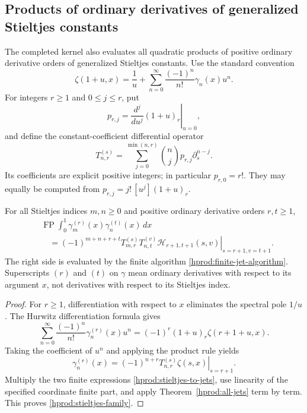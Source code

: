 \subsection{Products of ordinary derivatives of generalized Stieltjes constants}

The completed kernel also evaluates all quadratic products of positive
ordinary derivative orders of generalized Stieltjes constants.  Use the
standard convention
\[
 \zeta(1+u,x)=\frac1u+
 \sum_{n=0}^{\infty}\frac{(-1)^n}{n!}\gamma_n(x)u^n.
\]
For integers $r\ge1$ and $0\le j\le r$, put
\[
 p_{r,j}=\left.\frac{d^j}{du^j}(1+u)_r\right|_{u=0},
\]
and define the constant-coefficient differential operator
\begin{equation}\label{hprod:stieltjes-operator}
 T_{n,r}^{(s)}=
 \sum_{j=0}^{\min(n,r)}\binom nj p_{r,j}\partial_s^{n-j}.
\end{equation}
Its coefficients are explicit positive integers; in particular
$p_{r,0}=r!$.  They may equally be computed from
$p_{r,j}=j!\,[u^j](1+u)_r$.

\begin{corollary}
\label{hprod:stieltjes-products}
For all Stieltjes indices $m,n\ge0$ and positive ordinary derivative
orders $r,t\ge1$,
\begin{equation}\label{hprod:stieltjes-family}
 \begin{split}
 &\operatorname{FP}\int_0^1
       \gamma_m^{(r)}(x)\gamma_n^{(t)}(x)\,dx\\
 &\quad=(-1)^{m+n+r+t}
 \left.T_{m,r}^{(s)}T_{n,t}^{(v)}
       \mathscr H_{r+1,t+1}(s,v)\right|_{s=r+1,v=t+1}.
 \end{split}
\end{equation}
The right side is evaluated by the finite algorithm
\eqref{hprod:finite-jet-algorithm}.  Superscripts $(r)$ and $(t)$
on $\gamma$ mean ordinary derivatives with respect to its argument
$x$, not derivatives with respect to its Stieltjes index.
\end{corollary}

\begin{proof}
For $r\ge1$, differentiation with respect to $x$ eliminates the
spectral pole $1/u$.  The Hurwitz differentiation formula gives
\[
 \sum_{n=0}^{\infty}\frac{(-1)^n}{n!}
       \gamma_n^{(r)}(x)u^n
 =(-1)^r(1+u)_r\zeta(r+1+u,x).
\]
Taking the coefficient of $u^n$ and applying the product rule yields
\begin{equation}\label{hprod:stieltjes-to-jets}
 \gamma_n^{(r)}(x)=(-1)^{n+r}
 \left.T_{n,r}^{(s)}\zeta(s,x)\right|_{s=r+1}.
\end{equation}
Multiply the two finite expressions
\eqref{hprod:stieltjes-to-jets}, use linearity of the specified
coordinate finite part, and apply Theorem~\ref{hprod:all-jets}
term by term.  This proves \eqref{hprod:stieltjes-family}.
\end{proof}

